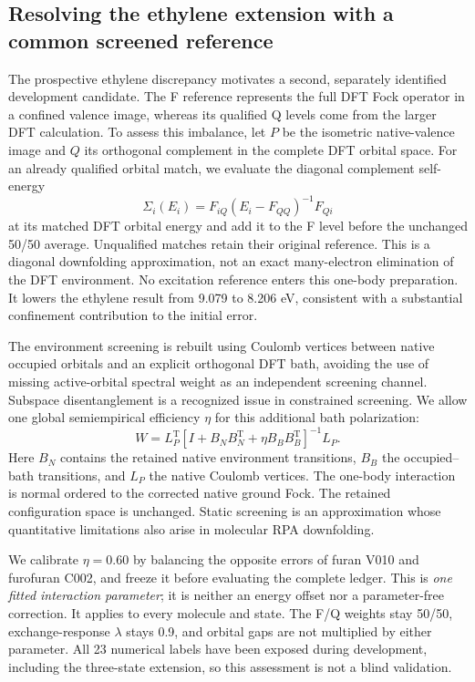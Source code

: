 \subsection{Resolving the ethylene extension with a common screened reference}
The prospective ethylene discrepancy motivates a second, separately
identified development candidate. The F reference represents the full DFT
Fock operator in a confined valence image, whereas its qualified Q levels
come from the larger DFT calculation. To assess this imbalance, let $P$
be the isometric native-valence image and $Q$ its orthogonal complement
in the complete DFT orbital space. For an already qualified orbital match,
we evaluate the diagonal complement self-energy
\begin{equation}
 \Sigma_i(E_i)=F_{iQ}(E_i-F_{QQ})^{-1}F_{Qi}
\end{equation}
at its matched DFT orbital energy and add it to the F level before the
unchanged 50/50 average. Unqualified matches retain their original reference.
This is a diagonal downfolding approximation, not an exact many-electron
elimination of the DFT environment. No excitation reference enters this
one-body preparation. It lowers the ethylene result from 9.079 to 8.206 eV,
consistent with a substantial confinement contribution to the initial error.

The environment screening is rebuilt using Coulomb vertices between native
occupied orbitals and an explicit orthogonal DFT bath, avoiding the use of
missing active-orbital spectral weight as an independent screening channel.
Subspace disentanglement is a recognized issue in constrained
screening.\cite{miyake2009} We allow one global semiempirical efficiency
$\eta$ for this additional bath polarization:
\begin{equation}
 W=L_P^\mathrm{T}
 \left[I+B_NB_N^\mathrm{T}+\eta B_BB_B^\mathrm{T}\right]^{-1}L_P .
\end{equation}
Here $B_N$ contains the retained native environment transitions, $B_B$
the occupied--bath transitions, and $L_P$ the native Coulomb vertices.
The one-body interaction is normal ordered to the corrected native ground
Fock. The retained configuration space is unchanged. Static screening is
an approximation whose quantitative limitations also arise in molecular
RPA downfolding.\cite{verzijl2026}

We calibrate $\eta=0.60$ by balancing the opposite errors of furan V010
and furofuran C002, and freeze it before evaluating the complete ledger.
This is \emph{one fitted interaction parameter}; it is neither an energy
offset nor a parameter-free correction. It applies to every molecule and
state. The F/Q weights stay 50/50, exchange-response $\lambda$ stays 0.9,
and orbital gaps are not multiplied by either parameter. All 23 numerical
labels have been exposed during development, including the three-state
extension, so this assessment is not a blind validation.

